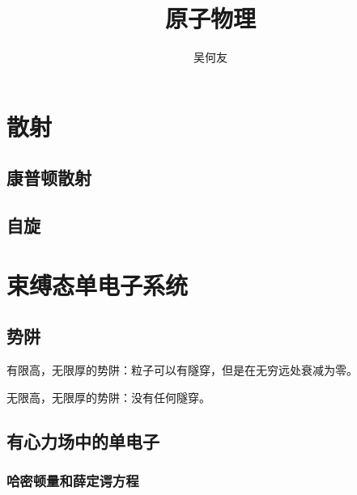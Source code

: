 \documentclass[UTF8, a4paper]{ctexart}
\title{原子物理}
\author{吴何友}
\begin{document}
\maketitle

\section{散射}

\subsection{康普顿散射}

\subsection{自旋}

\section{束缚态单电子系统}

\subsection{势阱}

有限高，无限厚的势阱：粒子可以有隧穿，但是在无穷远处衰减为零。

无限高，无限厚的势阱：没有任何隧穿。

\subsection{有心力场中的单电子}

\subsubsection{哈密顿量和薛定谔方程}
\end{document}
